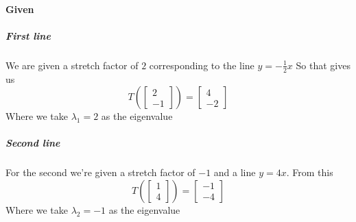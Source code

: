 \documentclass{article}
\begin{document}
            \paragraph{Given}
                \subparagraph{First line}
                    We are given a stretch factor of $2$ corresponding to the line $y=-\frac{1}{2}x$
                    So that gives us
                    \[
                        T(\begin{bmatrix}2\\-1\end{bmatrix})=\begin{bmatrix}4\\-2\end{bmatrix}
                    \]
                    Where we take $\lambda_1=2$ as the eigenvalue
                \subparagraph{Second line}
                    For the second we're given a stretch factor of $-1$ and a line $y=4x$. From this
                    \[
                        T(\begin{bmatrix}1\\4\end{bmatrix})=\begin{bmatrix}-1\\-4\end{bmatrix}
                    \]
                    Where we take $\lambda_2=-1$ as the eigenvalue
\end{document}
